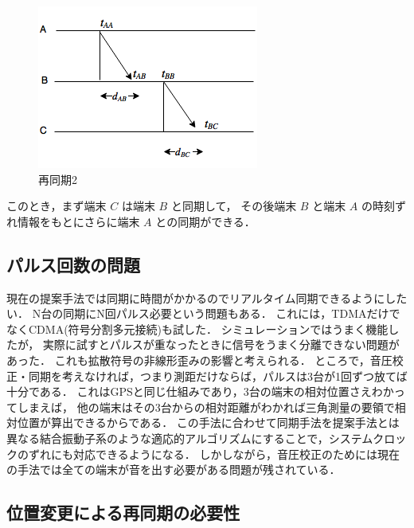 \begin{figure}[p]
  \centering
  \includegraphics[clip,width=1.05\hsize]{img/rel_delay.png}
  \caption{再同期2}\label{fig:rd}
\end{figure}

このとき，まず端末 $C$ は端末 $B$ と同期して，
その後端末 $B$ と端末 $A$ の時刻ずれ情報をもとにさらに端末 $A$ との同期ができる．



\subsection{パルス回数の問題}
現在の提案手法では同期に時間がかかるのでリアルタイム同期できるようにしたい．
N台の同期にN回パルス必要という問題もある．
これには，TDMAだけでなくCDMA(符号分割多元接続)も試した．
シミュレーションではうまく機能したが，
実際に試すとパルスが重なったときに信号をうまく分離できない問題があった．
これも拡散符号の非線形歪みの影響と考えられる．
ところで，音圧校正・同期を考えなければ，つまり測距だけならば，パルスは3台が1回ずつ放てば十分である．
これはGPSと同じ仕組みであり，3台の端末の相対位置さえわかってしまえば，
他の端末はその3台からの相対距離がわかれば三角測量の要領で相対位置が算出できるからである．
この手法に合わせて同期手法を提案手法とは異なる結合振動子系のような適応的アルゴリズムにすることで，システムクロックのずれにも対応できるようになる．
しかしながら，音圧校正のためには現在の手法では全ての端末が音を出す必要がある問題が残されている．


\subsection{位置変更による再同期の必要性}


